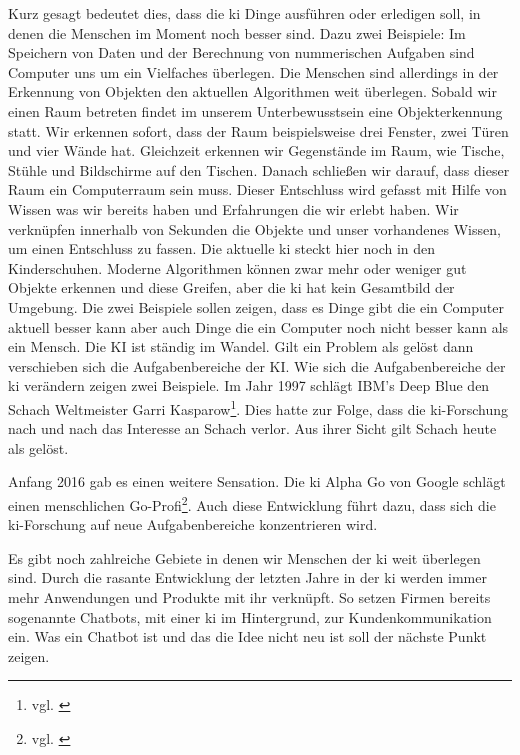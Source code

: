 Kurz gesagt bedeutet dies, dass die \ac{ki} Dinge ausführen oder erledigen soll, in denen die Menschen im Moment noch besser sind. Dazu zwei Beispiele: \newline
Im Speichern von Daten und der Berechnung von nummerischen Aufgaben sind Computer uns um ein Vielfaches überlegen. \newline
 Die Menschen sind allerdings in der Erkennung von Objekten den aktuellen Algorithmen weit überlegen. Sobald wir einen Raum betreten findet im unserem Unterbewusstsein eine Objekterkennung statt. Wir erkennen sofort, dass der Raum beispielsweise drei Fenster, zwei Türen und vier Wände hat. Gleichzeit erkennen wir Gegenstände im Raum, wie Tische, Stühle und Bildschirme auf den Tischen. Danach schließen wir darauf, dass dieser Raum ein Computerraum sein muss. Dieser Entschluss wird gefasst mit Hilfe von Wissen was wir bereits haben und Erfahrungen die wir erlebt haben. Wir verknüpfen innerhalb von Sekunden die Objekte und unser vorhandenes Wissen, um einen Entschluss zu fassen. Die aktuelle \ac{ki} steckt hier noch in den Kinderschuhen. Moderne Algorithmen können zwar mehr oder weniger gut Objekte erkennen und diese Greifen, aber die \ac{ki} hat kein Gesamtbild der Umgebung. Die zwei Beispiele sollen zeigen, dass es Dinge gibt die ein Computer aktuell besser kann aber auch Dinge die ein Computer noch nicht besser kann als ein Mensch. Die KI ist ständig im Wandel. Gilt ein Problem als gelöst dann verschieben sich die Aufgabenbereiche der KI.   
Wie sich die Aufgabenbereiche der \ac{ki} verändern zeigen zwei Beispiele. Im Jahr 1997 schlägt IBM's Deep Blue den Schach Weltmeister Garri Kasparow\footnote{vgl. \cite{SchachQuelle}}. Dies hatte zur Folge, dass die \ac{ki}-Forschung nach und nach das Interesse an Schach verlor. Aus ihrer Sicht gilt Schach heute als gelöst. 

Anfang 2016 gab es einen weitere Sensation. Die \ac{ki} Alpha Go von Google schlägt einen menschlichen Go-Profi\footnote{vgl. \cite{GoQuelle}}. Auch diese Entwicklung führt dazu, dass sich die \ac{ki}-Forschung auf neue Aufgabenbereiche konzentrieren wird. 

Es gibt noch zahlreiche Gebiete in denen wir Menschen der \ac{ki} weit überlegen sind. Durch die rasante Entwicklung der letzten Jahre in der \ac{ki} werden immer mehr Anwendungen und Produkte mit ihr verknüpft. So setzen Firmen bereits sogenannte Chatbots, mit einer \ac{ki} im Hintergrund, zur Kundenkommunikation ein. Was ein Chatbot ist und das die Idee nicht neu ist soll der nächste Punkt zeigen. 

